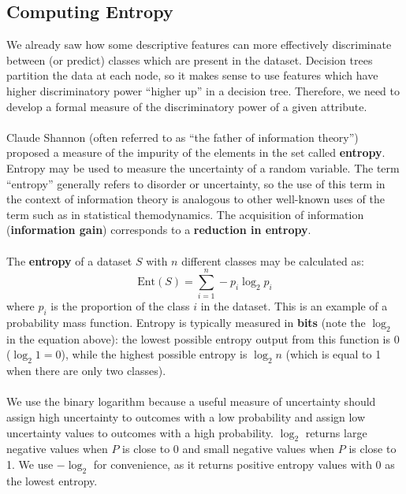 \documentclass[a4paper,11pt]{article}
\begin{document}
\subsection{Computing Entropy}
We already saw how some descriptive features can more effectively discriminate between (or predict) classes which are present in the dataset.
Decision trees partition the data at each node, so it makes sense to use features which have higher discriminatory power ``higher up'' in a decision tree.
Therefore, we need to develop a formal measure of the discriminatory power of a given attribute.
\\\\
Claude Shannon (often referred to as ``the father of information theory'') proposed a measure of the impurity of the elements in the set called \textbf{entropy}.
Entropy may be used to measure the uncertainty of a random variable.
The term ``entropy'' generally refers to disorder or uncertainty, so the use of this term in the context of information theory is analogous to other well-known uses of the term such as in statistical themodynamics.
The acquisition of information (\textbf{information gain}) corresponds to a \textbf{reduction in entropy}.
\\\\
The \textbf{entropy} of a dataset $S$ with $n$ different classes may be calculated as:
\[
    \text{Ent}(S) = \sum^n_{i=1} -p_i \log_2 p_i
\]
where $p_i$ is the proportion of the class $i$ in the dataset.
This is an example of a probability mass function.
Entropy is typically measured in \textbf{bits} (note the $\log_2$ in the equation above):
the lowest possible entropy output from this function is 0 ($\log_2 1 = 0$), while the highest possible entropy is $\log_2n$ (which is equal to 1 when there are only two classes).
\\\\
We use the binary logarithm because a useful measure of uncertainty should assign high uncertainty to outcomes with a low probability and assign low uncertainty values to outcomes with a high probability.
$\log_2$ returns large negative values when $P$ is close to 0 and small negative values when $P$ is close to 1.
We use $-\log_2$ for convenience, as it returns positive entropy values with 0 as the lowest entropy.
\end{document}
